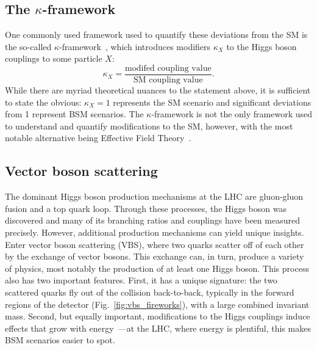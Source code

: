 \subsection{The $\kappa$-framework}
One commonly used framework used to quantify these deviations from the SM is the so-called $\kappa$-framework~\cite{KFrame}, which introduces modifiers $\kappa_X$ to the Higgs boson couplings to some particle $X$:
\begin{equation}
    \kappa_X = \frac{\text{modifed coupling value}}{\text{SM coupling value}}.
\end{equation}
While there are myriad theoretical nuances to the statement above, it is sufficient to state the obvious: $\kappa_X = 1$ represents the SM scenario and significant deviations from 1 represent BSM scenarios. 
The $\kappa$-framework is not the only framework used to understand and quantify modifications to the SM, however, with the most notable alternative being Effective Field Theory~\cite{EFT, DimSix}. 

\subsection{Vector boson scattering}
The dominant Higgs boson production mechanisms at the LHC are gluon-gluon fusion and a top quark loop. %
Through these processes, the Higgs boson was discovered and many of its branching ratios and couplings have been measured precisely. 
However, additional production mechanisms can yield unique insights. 
Enter vector boson scattering (VBS)\footnotemark{}, where two quarks scatter off of each other by the exchange of vector bosons. %
This exchange can, in turn, produce a variety of physics, most notably the production of at least one Higgs boson. 
This process also has two important features. 
First, it has a unique signature: the two scattered quarks fly out of the collision back-to-back, typically in the forward regions of the detector (Fig.~\ref{fig:vbs_fireworks}), with a large combined invariant mass. 
Second, but equally important, modifications to the Higgs couplings induce effects that grow with energy~\cite{HiggsWithoutHiggs}---at the LHC, where energy is plentiful, this makes BSM scenarios easier to spot. 

